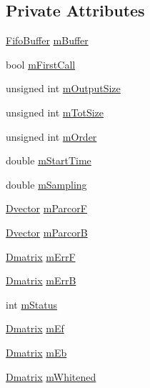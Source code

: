 \subsection*{Private Attributes}
\begin{DoxyCompactItemize}
\item 
\hyperlink{classtsa_1_1_fifo_buffer}{Fifo\+Buffer} \hyperlink{classtsa_1_1_double_whitening_ad472c774f12c7ad546950187be9bafce}{m\+Buffer}
\item 
bool \hyperlink{classtsa_1_1_double_whitening_abcf4caf8a0d07a8ab19c61b73f5e36b7}{m\+First\+Call}
\item 
unsigned int \hyperlink{classtsa_1_1_double_whitening_a921503ab03e5b133a04795f04ee73b42}{m\+Output\+Size}
\item 
unsigned int \hyperlink{classtsa_1_1_double_whitening_a2cce95c06b23e6311261476052941d7c}{m\+Tot\+Size}
\item 
unsigned int \hyperlink{classtsa_1_1_double_whitening_afb79abe4e14ab46247a46de61f732db8}{m\+Order}
\item 
double \hyperlink{classtsa_1_1_double_whitening_a41231ba5d7395b08cd8a36578dc639a5}{m\+Start\+Time}
\item 
double \hyperlink{classtsa_1_1_double_whitening_a2bb0cecac07b14fbd1f05df23138f7e8}{m\+Sampling}
\item 
\hyperlink{namespacetsa_a8900fb03d849baf447a1a0efe2561fb2}{Dvector} \hyperlink{classtsa_1_1_double_whitening_a6a5ffe2b00d598c95a10913b42383361}{m\+ParcorF}
\item 
\hyperlink{namespacetsa_a8900fb03d849baf447a1a0efe2561fb2}{Dvector} \hyperlink{classtsa_1_1_double_whitening_a6b5cc8f3c501692349449d6580b739a5}{m\+ParcorB}
\item 
\hyperlink{namespacetsa_ad260cd21c1891c4ed391fe788569aba4}{Dmatrix} \hyperlink{classtsa_1_1_double_whitening_aa89217d3e82036c041f44e8f9d31951c}{m\+ErrF}
\item 
\hyperlink{namespacetsa_ad260cd21c1891c4ed391fe788569aba4}{Dmatrix} \hyperlink{classtsa_1_1_double_whitening_aeb88a0efebbd64e8b1cacaf574e62cfb}{m\+ErrB}
\item 
int \hyperlink{classtsa_1_1_double_whitening_acf877cd00f9096595ccf1bf96e07e70d}{m\+Status}
\item 
\hyperlink{namespacetsa_ad260cd21c1891c4ed391fe788569aba4}{Dmatrix} \hyperlink{classtsa_1_1_double_whitening_a210ca70e697ac431e21381905392223f}{m\+Ef}
\item 
\hyperlink{namespacetsa_ad260cd21c1891c4ed391fe788569aba4}{Dmatrix} \hyperlink{classtsa_1_1_double_whitening_a43a337d8f3320fe180dea2d4266a2a2a}{m\+Eb}
\item 
\hyperlink{namespacetsa_ad260cd21c1891c4ed391fe788569aba4}{Dmatrix} \hyperlink{classtsa_1_1_double_whitening_ae27de92c8e9e51195590dc842ce211e6}{m\+Whitened}
\end{DoxyCompactItemize}


